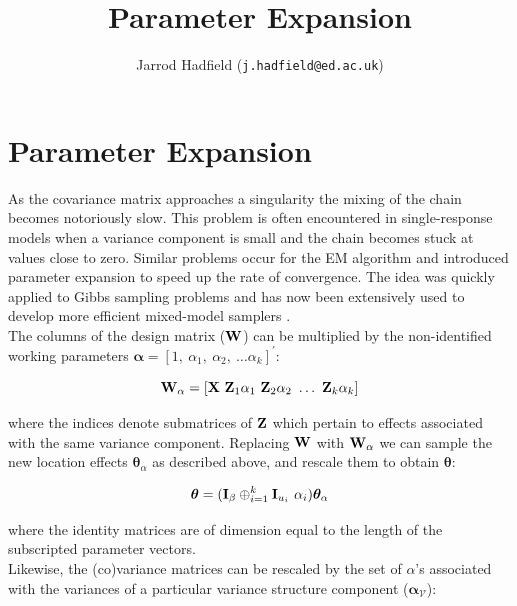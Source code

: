 \documentclass{article}
\title{Parameter Expansion}
\author{Jarrod Hadfield (\texttt{j.hadfield@ed.ac.uk})}
\begin{document}
\maketitle
\else
\chapter{Parameter Expansion}
\label{secPX}
\fi


As the covariance matrix approaches a singularity the mixing of the chain becomes notoriously slow. This problem is often encountered in single-response models when a variance component is small and the chain becomes stuck at values close to zero.  Similar problems occur for the EM algorithm and \citep{Liu.1998} introduced parameter expansion to speed up the rate of convergence. The idea was quickly applied to Gibbs sampling problems \citet{Liu.1999} and has now been extensively used to develop more efficient mixed-model samplers \citep[e.g.][]{vanDyk.2001, Gelman.2008b, Browne.2009}.\\

The columns of the design matrix (${\bf W}$) can be multiplied by the non-identified working parameters ${\bm \alpha} = \left[1,\ \alpha_{1},\ \alpha_{2},\ \dots \alpha_{k}\right]^{'}$:

\begin{equation} 
{\bf W}_{\alpha} = \left[{\bf X}\ {\bf Z}_{1}\alpha_{1}\ {\bf Z}_{2}\alpha_{2}\ \dots\ {\bf Z}_{k}\alpha_{k}\right]
\label{wstar}
\end{equation}

where the indices denote submatrices of ${\bf Z}$ which pertain to effects associated with the same variance component. Replacing  ${\bf W}$ with ${\bf W}_{\alpha}$ we can sample the new location effects  ${\bm \theta}_{\alpha}$ as described above, and rescale them to obtain ${\bm \theta}$:

\begin{equation} 
{\bm \theta} = ({\bf I}_{\beta}\oplus_{i=1}^{k}{\bf I}_{u_{i}}\ \alpha_{i}){\bm \theta}_{\alpha}
\end{equation}

where the identity matrices are of dimension equal to the length of the subscripted parameter vectors.\\ 


Likewise, the (co)variance matrices can be rescaled by the set of $\alpha$'s associated with the variances of a particular variance structure component (${\bm \alpha}_{\mathcal{V}}$):
\end{document}
